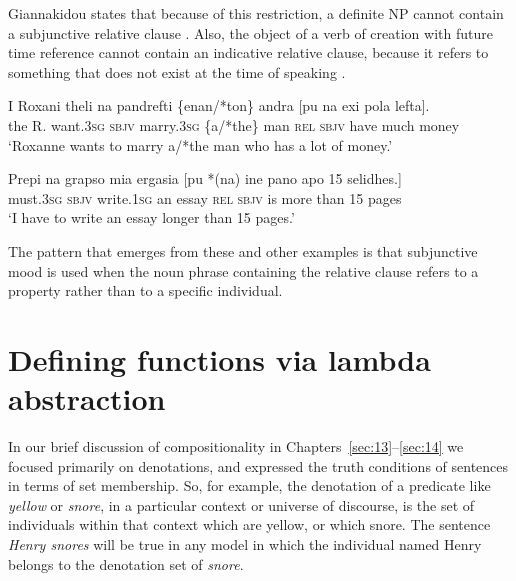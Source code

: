 Giannakidou states that because of this restriction, a definite NP cannot contain a subjunctive relative clause . Also, the object of a verb of creation with future time reference cannot contain an indicative relative clause, because it refers to something that does not exist at the time of speaking .


\ea \label{ex:15.34} 
\gll I  Roxani  theli  na  pandrefti  \{enan/*ton\}  andra [pu  na  exi  pola  lefta]. \\
the  R.  want.\textsc{3sg} \textsc{sbjv}  marry.\textsc{3sg} \{a/*the\}  man  \textsc{rel}  \textsc{sbjv}  have  much  money\\
\glt ‘Roxanne wants to marry a/*the man who has a lot of money.’\\
\z 

\ea \label{ex:15.35}
\gll Prepi  na  grapso  mia  ergasia  [pu  *(na)\footnotemark {} ine  pano  apo  15  selidhes.]\\
must.\textsc{3sg} \textsc{sbjv}  write.\textsc{1sg} an  essay  \textsc{rel}  \textsc{sbjv}  is  more  than  15  pages\\
\glt ‘I have to write an essay longer than 15 pages.’\\
\z
{}

The pattern that emerges from these and other examples is that subjunctive mood is used when the noun phrase containing the relative clause refers to a property rather than to a specific individual.


\section{Defining functions via lambda abstraction}\label{sec:15.6}

In our brief discussion of compositionality in Chapters~\ref{sec:13}--\ref{sec:14} we focused primarily on denotations, and expressed the truth conditions of sentences in terms of set membership. So, for example, the denotation of a predicate like \textit{yellow} or \textit{snore}, in a particular context or universe of discourse, is the set of individuals within that context which are yellow, or which snore. The sentence \textit{Henry snores} will be true in any model in which the individual named Henry belongs to the denotation set of \textit{snore}.



